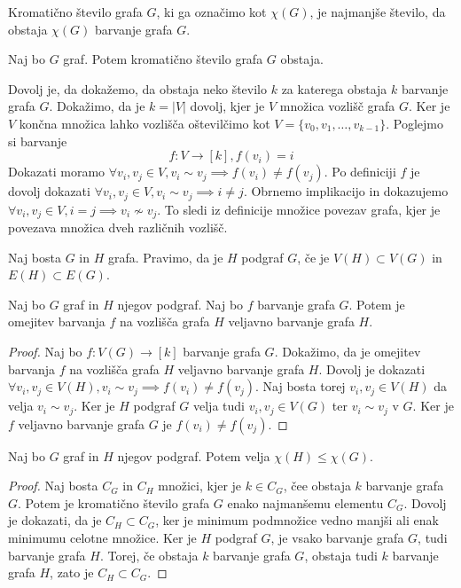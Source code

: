 \documentclass[mat1]{fmfdelo}
\begin{document}
\begin{definicija}
    Kromatično število grafa $G$, ki ga označimo kot $\chi(G)$, je najmanjše število, da obstaja $\chi(G)$ barvanje grafa $G$.
\end{definicija} 
\begin{lema}
    Naj bo $G$ graf. Potem kromatično število grafa $G$ obstaja.
\end{lema}
\begin{dokaz}
    Dovolj je, da dokažemo, da obstaja neko število $k$ za katerega obstaja $k$ barvanje grafa $G$.
    Dokažimo, da je $k=|V|$ dovolj, kjer je $V$ množica vozlišč grafa $G$. Ker je $V$ končna množica
    lahko vozlišča oštevilčimo kot $V = \{v_0, v_1, \dots, v_{k-1}\}$. Poglejmo si barvanje 
    \[ f:V \to [k], f(v_i) = i\]
    Dokazati moramo $\forall v_i, v_j \in V, v_i \sim v_j\implies f(v_i)\neq f(v_j)$. Po definiciji $f$ je dovolj dokazati
    $\forall v_i, v_j \in V, v_i \sim v_j\implies i\neq j$. Obrnemo implikacijo in dokazujemo $\forall v_i, v_j \in V, i=j \implies
    v_i \nsim v_j$. To sledi iz definicije množice povezav grafa, kjer je povezava množica dveh različnih vozlišč. 
\end{dokaz}

\begin{definicija}
Naj bosta $G$ in $H$ grafa. Pravimo, da je $H$ podgraf $G$, če je $V(H)\subset V(G)$ in $E(H)\subset E(G)$.
\end{definicija}
\begin{lema}
    Naj bo $G$ graf in $H$ njegov podgraf. Naj bo $f$ barvanje grafa $G$. Potem je omejitev barvanja $f$ na vozlišča
    grafa $H$ veljavno barvanje grafa $H$.
\end{lema}
\begin{proof}
Naj bo $f:V(G)\to [k]$ barvanje grafa $G$. Dokažimo, da je omejitev barvanja $f$ na vozlišča grafa $H$ veljavno barvanje grafa $H$.
Dovolj je dokazati $\forall v_i, v_j \in V(H), v_i \sim v_j\implies f(v_i)\neq f(v_j)$. Naj bosta torej $v_i, v_j \in V(H)$ 
da velja $v_i \sim v_j$. Ker je $H$ podgraf $G$ velja tudi $v_i, v_j \in V(G)$ ter $v_i \sim v_j$ v $G$. Ker je $f$ veljavno barvanje
grafa $G$ je $f(v_i)\neq f(v_j)$.
\end{proof}


\begin{lema}
    Naj bo $G$ graf in $H$ njegov podgraf. Potem velja $\chi(H)\leq \chi(G)$.
\end{lema}
\begin{proof}
    Naj bosta $C_G$ in $C_H$ množici, kjer je $k\in C_G$, čee obstaja $k$ barvanje grafa $G$. Potem je kromatično število
    grafa $G$ enako najmanšemu elementu $C_G$. Dovolj je dokazati, da je $C_H\subset C_G$, ker je minimum podmnožice vedno
    manjši ali enak minimumu celotne množice. Ker je $H$ podgraf $G$, je vsako barvanje grafa $G$, tudi barvanje grafa $H$.
    Torej, če obstaja $k$ barvanje grafa $G$, obstaja tudi $k$ barvanje grafa $H$, zato je $C_H\subset C_G$.
\end{proof}
\end{document}

